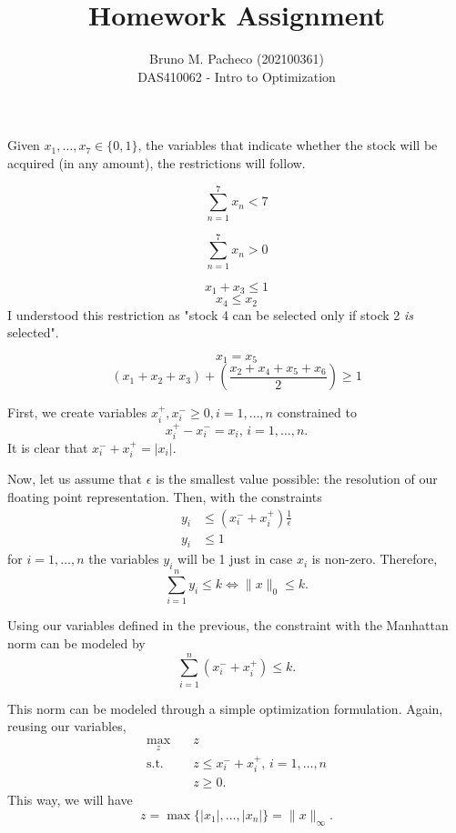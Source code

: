 \documentclass[a4paper]{report}
\begin{document}
 
\title{Homework Assignment}
\author{Bruno M. Pacheco (202100361) \\
DAS410062 - Intro to Optimization}
 
\maketitle
 

Given $x_1,\ldots,x_7 \in \{0,1\} $, the variables that indicate whether the stock will be acquired (in any amount), the restrictions will follow.


\[
\sum_{n=1}^{7} x_{n} < 7
\]


\[
\sum_{n=1}^{7} x_{n} > 0
\] 

\[
x_1+x_3 \le 1
\]
\[
x_4\le x_2
\] 
I understood this restriction as "stock 4 can be selected only if stock 2 \emph{is} selected".

\[
x_1=x_5
\]
\[
\left( x_1+x_2+x_3 \right) + \left( \frac{x_2+x_4+x_5+x_6}{2} \right) \ge 1
\] 



First, we create variables $x_{i}^{+}, x_{i}^{-} \ge 0, i=1,\ldots,n$ constrained to \[
x_{i}^{+}-x_{i}^{-} = x_{i},\,i=1,\ldots,n
.\] It is clear that $x_{i}^{-}+x_{i}^{+} = |x_{i}|$.

Now, let us assume that $\epsilon$ is the smallest value possible: the resolution of our floating point representation. Then, with the constraints
\begin{align*}
    y_{i} &\le \left( x_{i}^{-}+x_{i}^{+} \right)  \frac{1}{\epsilon} \\
    y_{i} &\le 1
\end{align*}
for $i=1,\ldots,n$ the variables $y_{i}$ will be 1 just in case $x_{i}$ is non-zero. Therefore, \[
\sum_{i=1}^{n} y_{i} \le k \iff \|x\|_0 \le k
.\] 


Using our variables defined in the previous, the constraint with the Manhattan norm can be modeled by \[
\sum_{i=1}^{n} \left( x_{i}^{-} + x_{i}^{+} \right) \le k
.\] 


This norm can be modeled through a simple optimization formulation. Again, reusing our variables,
\begin{align*}
    \max_{z} \quad & z \\
    \textrm{s.t.} \quad & z \le x_{i}^{-}+x_{i}^{+},\,i=1,\ldots,n \\
      & z \ge 0
.\end{align*}
This way, we will have \[
    z = \max \{|x_1|,\ldots,|x_{n}|\} = \|x\|_\infty
.\]
\end{document}
